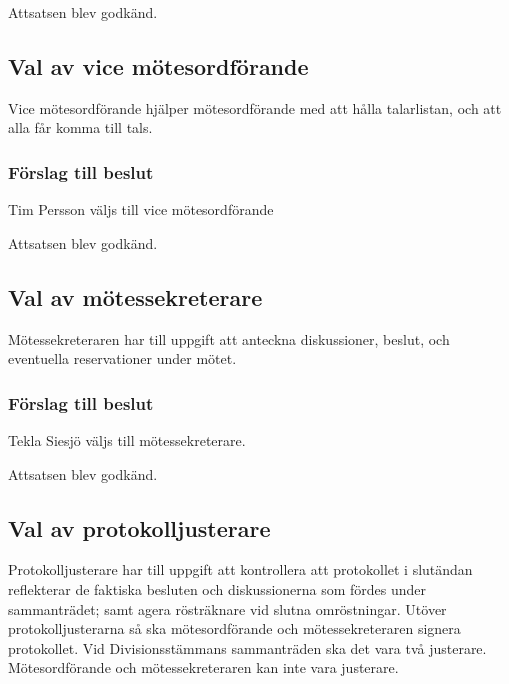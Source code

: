 \documentclass[protokoll]{dvd}
\begin{document}
Attsatsen blev godkänd.

\subsection{Val av vice mötesordförande}

Vice mötesordförande hjälper mötesordförande med att hålla talarlistan, och att alla får komma till tals.

\subsubsection*{Förslag till beslut}

\begin{attsatser}
    \item Tim Persson väljs till vice mötesordförande
\end{attsatser}

Attsatsen blev godkänd.

\subsection{Val av mötessekreterare}

Mötessekreteraren har till uppgift att anteckna diskussioner, beslut, och eventuella reservationer under mötet.

\subsubsection*{Förslag till beslut}

\begin{attsatser}
    \item Tekla Siesjö väljs till mötessekreterare.
\end{attsatser}

Attsatsen blev godkänd.

\subsection{Val av protokolljusterare}

Protokolljusterare har till uppgift att kontrollera att protokollet i slutändan reflekterar de faktiska besluten och diskussionerna som fördes under sammanträdet; samt agera rösträknare vid slutna omröstningar.
Utöver protokolljusterarna så ska mötesordförande och mötessekreteraren signera protokollet.
Vid Divisionsstämmans sammanträden ska det vara två justerare.
Mötesordförande och mötessekreteraren kan inte vara justerare.
\end{document}
